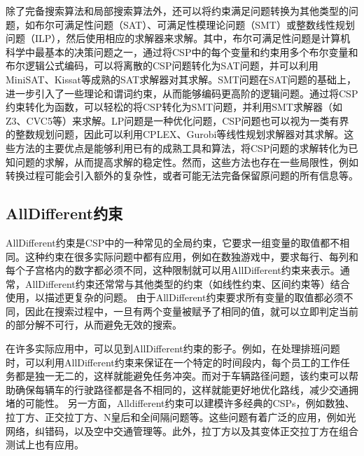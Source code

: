 除了完备搜索算法和局部搜索算法外，还可以将约束满足问题转换为其他类型的问题，如布尔可满足性问题（SAT）\cite{biere2009handbook}、可满足性模理论问题（SMT）\cite{barrett2018satisfiability}或整数线性规划问题（ILP）\cite{dantzig2002linear}，然后使用相应的求解器来求解。其中，布尔可满足性问题是计算机科学中最基本的决策问题之一，通过将CSP中的每个变量和约束用多个布尔变量和布尔逻辑公式编码，可以将离散的CSP问题转化为SAT问题，并可以利用MiniSAT\cite{sorensson2005minisat}、Kissat等成熟的SAT求解器对其求解。SMT问题在SAT问题的基础上，进一步引入了一些理论和谓词约束，从而能够编码更高阶的逻辑问题。通过将CSP约束转化为函数，可以轻松的将CSP转化为SMT问题，并利用SMT求解器（如Z3\cite{de2008z3}、CVC5\cite{barbosa2022cvc5}等）来求解。LP问题是一种优化问题，CSP问题也可以视为一类有界的整数规划问题，因此可以利用CPLEX、Gurobi等线性规划求解器对其求解。这些方法的主要优点是能够利用已有的成熟工具和算法，将CSP问题的求解转化为已知问题的求解，从而提高求解的稳定性。然而，这些方法也存在一些局限性，例如转换过程可能会引入额外的复杂性，或者可能无法完备保留原问题的所有信息等。

\subsection{AllDifferent约束}
AllDifferent约束\cite{van2001alldifferent}是CSP中的一种常见的全局约束，它要求一组变量的取值都不相同。这种约束在很多实际问题中都有应用，例如在数独游戏中，要求每行、每列和每个子宫格内的数字都必须不同，这种限制就可以用AllDifferent约束来表示。通常，AllDifferent约束还常常与其他类型的约束（如线性约束、区间约束等）结合使用，以描述更复杂的问题。
由于AllDifferent约束要求所有变量的取值都必须不同，因此在搜索过程中，一旦有两个变量被赋予了相同的值，就可以立即判定当前的部分解不可行，从而避免无效的搜索。

在许多实际应用中，可以见到AllDifferent约束的影子。例如，在处理排班问题时，可以利用AllDifferent约束来保证在一个特定的时间段内，每个员工的工作任务都是独一无二的，这样就能避免任务冲突。而对于车辆路径问题，该约束可以帮助确保每辆车的行驶路径都是各不相同的，这样就能更好地优化路线，减少交通拥堵的可能性。
另一方面，Alldifferent约束可以建模许多经典的CSPs，例如数独、拉丁方、正交拉丁方、N皇后和全间隔问题等。这些问题有着广泛的应用，例如光网络\cite{kumar1999approximating}，纠错码\cite{colbourn2004permutation}，以及空中交通管理\cite{barnier2004graph}等。此外，拉丁方以及其变体正交拉丁方在组合测试上也有应用\cite{mandl1985orthogonal, zhang2014automatic}。

